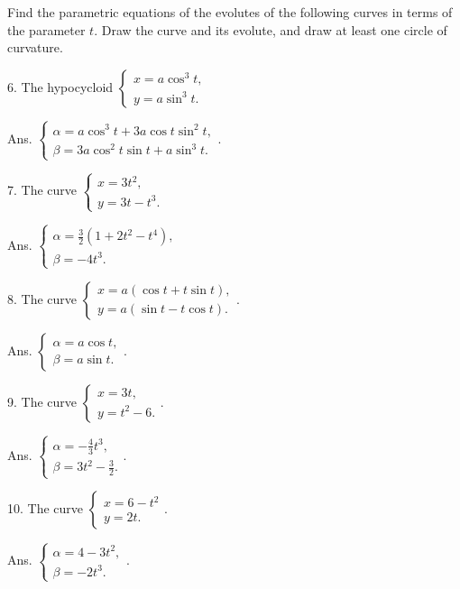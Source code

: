 Find the parametric equations of the evolutes of the 
following curves in terms of the parameter $t$. 
Draw the curve and its evolute, and draw at least one circle of curvature.

6. The hypocycloid 
$\begin{cases} x = a \cos^3 t, 
\\ y = a \sin^3 t. \end{cases}$ 	

Ans. 	
$\begin{cases} \alpha = a \cos^3 t + 3a \cos t \sin^2 t, 
\\ \beta = 3a \cos^2 t \sin t + a \sin^3 t. \end{cases}$.

7. The curve 	
$\begin{cases} x = 3t^2, 
\\ y = 3t - t^3. \end{cases}$

Ans.
$\begin{cases} \alpha 
= \frac{3}{2} ( 1 + 2t^2 - t^4 ), \\ 
\beta = -4 t^3. \end{cases}$

8. The curve 	
$\begin{cases} x = a(\cos t + t \sin t), \\ 
y = a(\sin t - t \cos t). \end{cases}$. 

Ans. 	
$\begin{cases} \alpha = a \cos t, 
\\ \beta = a \sin t. \end{cases}$.

9. The curve 
$\begin{cases} x = 3t, 
\\ y = t^2 -6. \end{cases}$.

Ans. $\begin{cases} \alpha = -\frac{4}{3} t^3, \\ 
\beta = 3t^2 - \frac{3}{2}. \end{cases}$.

10. The curve 	
$\begin{cases} x = 6 - t^2 \\ 
y = 2t. \end{cases}$.

Ans. $\begin{cases} \alpha = 4 - 3t^2, \\
\beta = -2t^3. \end{cases}$.



